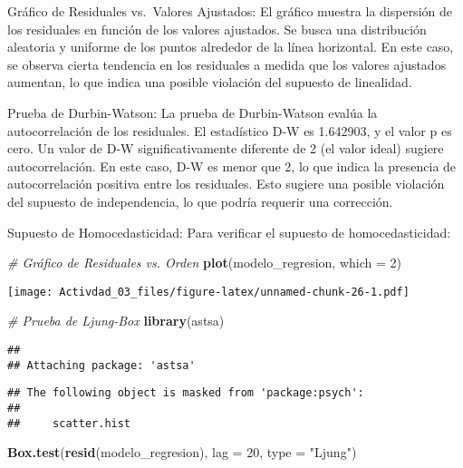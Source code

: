 \documentclass[
]{article}
\newenvironment{Shaded}{\begin{snugshade}}{\end{snugshade}}
\newcommand{\AttributeTok}[1]{\textcolor[rgb]{0.13,0.29,0.53}{#1}}
\newcommand{\CommentTok}[1]{\textcolor[rgb]{0.56,0.35,0.01}{\textit{#1}}}
\newcommand{\DecValTok}[1]{\textcolor[rgb]{0.00,0.00,0.81}{#1}}
\newcommand{\FunctionTok}[1]{\textcolor[rgb]{0.13,0.29,0.53}{\textbf{#1}}}
\newcommand{\NormalTok}[1]{#1}
\newcommand{\StringTok}[1]{\textcolor[rgb]{0.31,0.60,0.02}{#1}}
\begin{document}
Gráfico de Residuales vs.~Valores Ajustados: El gráfico muestra la
dispersión de los residuales en función de los valores ajustados. Se
busca una distribución aleatoria y uniforme de los puntos alrededor de
la línea horizontal. En este caso, se observa cierta tendencia en los
residuales a medida que los valores ajustados aumentan, lo que indica
una posible violación del supuesto de linealidad.

Prueba de Durbin-Watson: La prueba de Durbin-Watson evalúa la
autocorrelación de los residuales. El estadístico D-W es 1.642903, y el
valor p es cero. Un valor de D-W significativamente diferente de 2 (el
valor ideal) sugiere autocorrelación. En este caso, D-W es menor que 2,
lo que indica la presencia de autocorrelación positiva entre los
residuales. Esto sugiere una posible violación del supuesto de
independencia, lo que podría requerir una corrección.

Supuesto de Homocedasticidad: Para verificar el supuesto de
homocedasticidad:

\begin{Shaded}
\begin{Highlighting}[]
\CommentTok{\# Gráfico de Residuales vs. Orden}
\FunctionTok{plot}\NormalTok{(modelo\_regresion, }\AttributeTok{which =} \DecValTok{2}\NormalTok{)}
\end{Highlighting}
\end{Shaded}

\texttt{[image: Activdad\_03\_files/figure-latex/unnamed-chunk-26-1.pdf]}

\begin{Shaded}
\begin{Highlighting}[]
\CommentTok{\# Prueba de Ljung{-}Box}
\FunctionTok{library}\NormalTok{(astsa)}
\end{Highlighting}
\end{Shaded}

\begin{verbatim}
## 
## Attaching package: 'astsa'
\end{verbatim}

\begin{verbatim}
## The following object is masked from 'package:psych':
## 
##     scatter.hist
\end{verbatim}

\begin{Shaded}
\begin{Highlighting}[]
\FunctionTok{Box.test}\NormalTok{(}\FunctionTok{resid}\NormalTok{(modelo\_regresion), }\AttributeTok{lag =} \DecValTok{20}\NormalTok{, }\AttributeTok{type =} \StringTok{"Ljung"}\NormalTok{)}
\end{Highlighting}
\end{Shaded}
\end{document}
